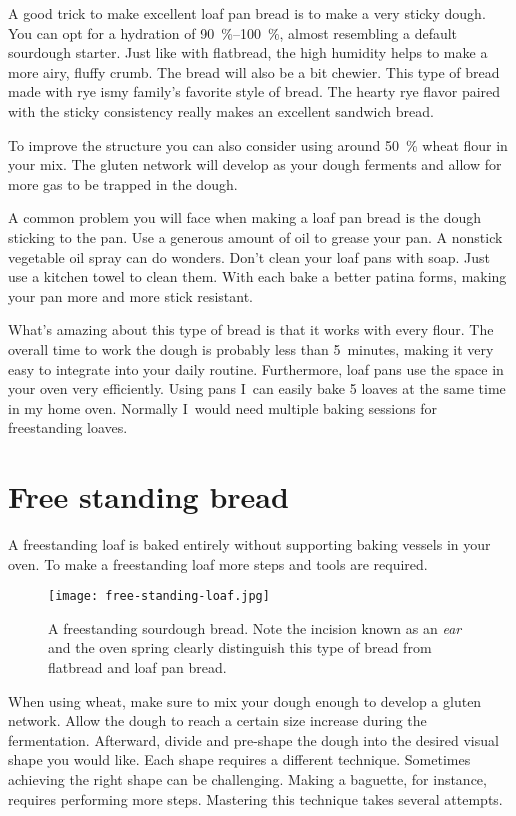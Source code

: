 A good trick to make excellent loaf pan bread is to make a very
sticky dough. You can opt for a hydration of \qtyrange{90}{100}{\percent}, almost
resembling a default sourdough starter. Just like with flatbread,
the high humidity helps to make a more airy, fluffy crumb. The bread will
also be a bit chewier. This type of bread made with rye ismy family's favorite
style of bread.  The hearty rye flavor paired with the sticky consistency really
makes an excellent sandwich bread.

To improve the structure you can also consider using around \qty{50}{\percent}
wheat flour in your mix. The gluten network will develop as your
dough ferments and allow for more gas to be trapped in the dough.

A common problem you will face when making a loaf pan bread is
the dough sticking to the pan. Use a generous amount of oil to grease
your pan. A nonstick vegetable oil spray can do wonders.
Don't clean your loaf pans with soap. Just use a kitchen towel
to clean them. With each bake a better patina forms, making your
pan more and more stick resistant.

What's amazing about this type of bread is that it works
with every flour. The overall time to work the dough is probably
less than 5~minutes, making it very easy to integrate
into your daily routine. Furthermore, loaf pans use the space
in your oven very efficiently. Using pans I~can
easily bake 5 loaves at the same time in my home oven.
Normally I~would need multiple baking sessions for
freestanding loaves.

\section{Free standing bread}

A freestanding loaf is baked entirely without supporting
baking vessels in your oven. To make a freestanding loaf more steps
and tools are required.

\begin{figure}[!htb]
\begin{center}
  \texttt{[image: free-standing-loaf.jpg]}
  \caption[Freestanding sourdough bread]{A freestanding sourdough bread. Note
      the incision known as an \emph{ear} and the oven spring clearly
      distinguish this type of bread from flatbread and loaf pan bread.}
\end{center}
\end{figure}

When using wheat, make sure to mix your dough enough to develop a gluten network.
Allow the dough to reach a certain size increase during the fermentation.
Afterward, divide and pre-shape the dough into the desired visual shape you
would like. Each shape requires a different technique. Sometimes achieving
the right shape can be challenging. Making a baguette, for instance,
requires performing more steps. Mastering this technique takes several attempts.

